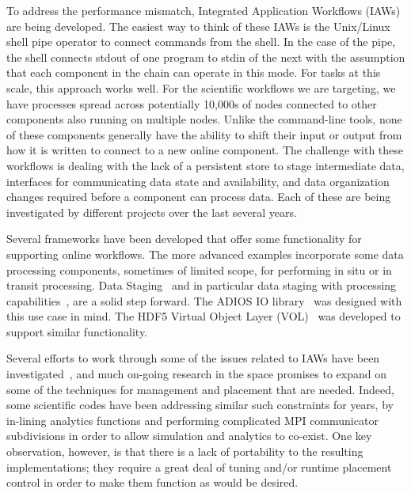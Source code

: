 \documentclass[conference]{IEEEtran}
\begin{document}
To address the performance mismatch, Integrated Application Workflows (IAWs)
are being developed. The easiest way to think of these IAWs is the Unix/Linux
shell pipe operator to connect commands from the shell. In the case of the
pipe, the shell connects stdout of one program to stdin of the next with the
assumption that each component in the chain can operate in this mode. For tasks
at this scale, this approach works well. For the scientific workflows we are
targeting, we have processes spread across potentially 10,000s of nodes
connected to other components also running on multiple nodes. Unlike the
command-line tools, none of these components generally have the ability to
shift their input or output from how it is written to connect to a new online
component. The challenge with these workflows is dealing with the lack of a
persistent store to stage intermediate data, interfaces for communicating data
state and availability, and data organization changes required before a
component can process data.  Each of these are being investigated by different
projects over the last several years.

Several frameworks have been developed that offer some functionality for
supporting online workflows. The more advanced examples incorporate some data
processing components, sometimes of limited scope, for performing in situ or in
transit processing. Data Staging~\cite{nisar:2008:staging} and in particular
data staging with processing
capabilities~\cite{abbasi:2009:datastaging,ober:seismic}, are a solid step
forward. The ADIOS IO library~\cite{lofstead:2009:adaptable} was designed with
this use case in mind. The HDF5 Virtual Object Layer
(VOL)~\cite{chaarawi:2013:hdf5-vol} was developed to support similar
functionality.

Several efforts to work through some of the issues related to IAWs have been
investigated~\cite{karimabadi:2013:catalyst,whitlock:2011:libsim,Glean,Flexpath,dreher:2016:bredala,zheng:2010:predata},
and much on-going research in the space promises to expand on some of the
techniques for management and placement that are needed.  Indeed, some
scientific codes have been addressing similar such constraints for years, by
in-lining analytics functions and performing complicated MPI communicator
subdivisions in order to allow simulation and analytics to co-exist.  One key
observation, however, is that there is a lack of portability to the resulting
implementations; they require a great deal of tuning and/or runtime placement
control in order to make them function as would be desired.
\end{document}
